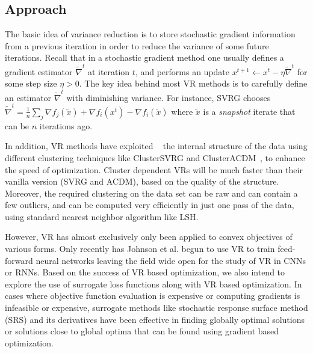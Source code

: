 \documentclass{article} %
\begin{document}
\subsection{Approach}

\newcommand{\tnabla}{\tilde{\nabla}}
\newcommand{\tx}{\tilde{x}}
\newcommand{\bx}{\bar{x}}
\newcommand{\lt}{\mathsf{lt}}
\newcommand{\li}{\mathsf{li}}
\newcommand{\cH}{H_{\mathsf{cl}}}

The basic idea of variance reduction is to store stochastic gradient information from a previous iteration in order to reduce the variance of some future iterations. Recall that in a stochastic gradient method one usually defines a gradient estimator $\tnabla^t$ at iteration $t$, and performs an update $x^{t+1} \gets x^t - \eta \tnabla^t$ for some step size $\eta>0$.
The key idea behind most VR methods is to carefully define an estimator $\tnabla^t$ with diminishing variance. For instance, SVRG chooses $\tnabla^t = \frac{1}{n} \sum_j \nabla f_j(\tx) + \nabla f_i(x^t) - \nabla f_i(\tx)$ where $\tx$ is a \emph{snapshot} iterate that can be $n$ iterations ago.

In addition, VR methods have exploited ~\cite{exploitingstructure,HLM2015} the internal structure of the data using different clustering techniques like ClusterSVRG and ClusterACDM~\cite{exploitingstructure}, to enhance the speed of optimization. Cluster dependent VRs will be much faster than their vanilla version (SVRG and ACDM), based on the quality of the structure.   
Moreover, the required clustering on the data set can be raw and can contain a few outliers, and can be computed very efficiently in just one pass of the data, using standard nearest neighbor algorithm like LSH. 

However, VR has almost exclusively only been applied to convex objectives of various forms. Only recently has Johnson et al. begun to use VR to train feed-forward neural networks \cite{JohnsonZhang2013-SVRG} leaving the field wide open for the study of VR in CNNs or RNNs. Based on the success of VR based optimization, we also intend to explore the use of surrogate loss functions along with VR based optimization. In cases where objective function evaluation is expensive or computing gradients is infeasible or expensive, surrogate methods like stochastic response surface method (SRS) and its derivatives \cite{regis-2007} have been effective in finding globally optimal solutions or solutions close to global optima that can be found using gradient based optimization.
\end{document}
